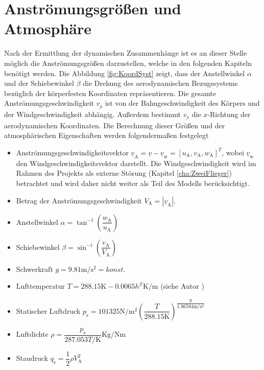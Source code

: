 \section{Anströmungsgrößen und Atmosphäre}
\label{sec:atmospäre}
Nach der Ermittlung der dynamischen Zusammenhänge ist es an dieser Stelle möglich die Anströmungsgrö{\ss}en darzustellen, welche in den folgenden Kapiteln benötigt werden. Die Abbildung \ref{fig:KoordSyst} zeigt, dass der Anstellwinkel $\alpha$ und der Schiebewinkel $\beta$ die Drehung des aerodynamischen Bezugssystems bezüglich der körperfesten Koordinaten repräsentieren. Die gesamte Anströmungsgeschwindigkeit $\underline{v_\mathrm{a}}$ ist von der Bahngeschwindigkeit des Körpers und der Windgeschwindigkeit abhängig. Au{\ss}erdem bestimmt $\underline{v_\mathrm{a}}$ die $x$-Richtung der aerodynamischen Koordinaten. Die Berechnung dieser Grö{\ss}en und der atmosphärischen Eigenschaften werden folgenderma{\ss}en festgelegt
\begin{itemize}
\item Anströmungsgeschwindigkeitsvektor $\underline{v}_\mathrm{A} = \underline{v}- \underline{v}_\mathrm{w}  = [u_\mathrm{A},v_\mathrm{A},w_\mathrm{A}]^T $, wobei $\underline{v}_\mathrm{w}$ den Windgeschwindigkeitsvektor darstellt. Die Windgeschwindigkeit wird im Rahmen des Projekts als externe Störung (Kapitel \ref{cha:ZweiFlieger}) betrachtet  und wird daher nicht weiter als Teil des Modells berücksichtigt.  
\item Betrag der Anströmungsgeschwindigkeit $V_\mathrm{A} = |\underline{v}_\mathrm{A}| $.
\item Anstellwinkel $\alpha = \tan^{-1}(\dfrac{w_\mathrm{A}}{u_\mathrm{A}})$
\item Schiebewinkel $\beta = \sin^{-1}(\dfrac{v_\mathrm{A}}{V_\mathrm{A}})$
\item Schwerkraft $g = 9.81 \mathrm{m/s^2} = konst.$
\item Lufttemperatur $ T = 288.15 \mathrm{K} - 0.0065h^\mathcal{G}\mathrm{K/m}$ (siehe Autor \cite{AircraftCS})
\item Statischer Luftdruck $p_\mathrm{s} = 101325\mathrm{N/m^2}(\dfrac{T}{288.15  \mathrm{K}})^{\dfrac{g}{1.86584 \mathrm{m/s^2}}}$
\item Luftdichte $\rho = \dfrac{p_\mathrm{s}}{287.053T/\mathrm{K}} \mathrm{Kg/Nm}$
\item Staudruck $q_\mathrm{s} = \dfrac{1}{2}\rho V_\mathrm{A}^2$

\end{itemize}
